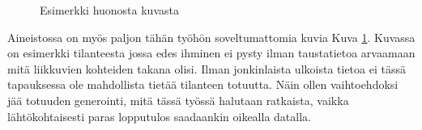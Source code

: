 \begin{figure}[h]
\centering
{}
\caption{Esimerkki huonosta kuvasta}
\label{fig:extreme}
\end{figure}

    
Aineistossa on myös paljon tähän työhön soveltumattomia kuvia Kuva \ref{fig:extreme}.
Kuvassa on esimerkki tilanteesta jossa edes ihminen ei pysty ilman taustatietoa arvaamaan mitä liikkuvien kohteiden takana olisi.
Ilman jonkinlaista ulkoista tietoa ei tässä tapauksessa ole mahdollista tietää tilanteen totuutta.
Näin ollen vaihtoehdoksi jää totuuden generointi, mitä tässä työssä halutaan ratkaista,
vaikka lähtökohtaisesti paras lopputulos saadaankin oikealla datalla.
